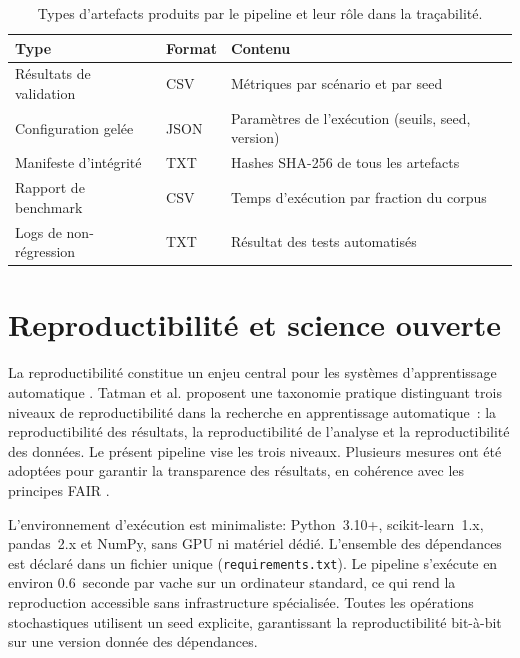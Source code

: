 \begin{table}[H]
    \centering
    \caption{Types d'artefacts produits par le pipeline et leur rôle dans la traçabilité.}
    \label{tab:artefacts_types}
    \begin{tabular}{lll}
        \toprule
        \textbf{Type} & \textbf{Format} & \textbf{Contenu} \\
        \midrule
        Résultats de validation & CSV & Métriques par scénario et par seed \\
        Configuration gelée & JSON & Paramètres de l'exécution (seuils, seed, version) \\
        Manifeste d'intégrité & TXT & Hashes SHA-256 de tous les artefacts \\
        Rapport de benchmark & CSV & Temps d'exécution par fraction du corpus \\
        Logs de non-régression & TXT & Résultat des tests automatisés \\
        \bottomrule
    \end{tabular}
\end{table}

\FloatBarrier
\section{Reproductibilité et science ouverte}

La reproductibilité constitue un enjeu central pour les systèmes d'apprentissage
automatique \citep{pineau2021improving}. Tatman et al. \citep{tatman2018practical}
proposent une taxonomie pratique distinguant trois niveaux de reproductibilité dans la
recherche en apprentissage automatique~: la reproductibilité des résultats, la reproductibilité de l'analyse
et la reproductibilité des données. Le présent pipeline vise les trois niveaux.
Plusieurs mesures ont été adoptées pour garantir la transparence des résultats,
en cohérence avec les principes FAIR \citep{wilkinson2016fair}.

L'environnement d'exécution est minimaliste: Python~3.10+, scikit-learn~1.x, pandas~2.x
et NumPy, sans GPU ni matériel dédié. L'ensemble des dépendances est déclaré dans un
fichier unique (\texttt{requirements.txt}). Le pipeline s'exécute en environ
0.6~seconde par vache sur un ordinateur standard, ce qui rend la reproduction accessible
sans infrastructure spécialisée. Toutes les opérations stochastiques utilisent un seed
explicite, garantissant la reproductibilité bit-à-bit sur une version donnée des
dépendances.

